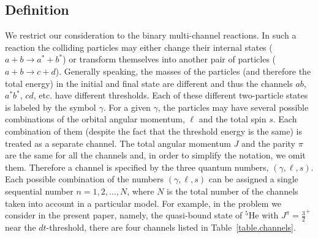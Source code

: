 \documentclass[12pt]{article}
\begin{document}
\subsection{Definition}
We restrict our consideration to the binary multi-channel
reactions. In such a reaction the colliding particles may either change their
internal states ($a+b\to a^*+b^*$) or transform themselves into another pair of
particles ($a+b\to c+d$). Generally speaking, the masses of the particles (and
therefore the total energy) in the initial and final state are different and
thus the channels $ab$, $a^*b^*$, $cd$, etc. have different thresholds. Each of
these different two-particle states is labeled by the symbol $\gamma$. For a
given $\gamma$, the particles may have several possible combinations of the
orbital angular momentum, $\ell$ and
the total spin $s$. Each combination of them (despite the fact that the
threshold energy is the same) is treated as a separate channel. The total
angular momentum $J$ and the parity $\pi$ are the same for all the channels and,
in order to simplify the notation, we omit them. Therefore a channel is
specified by the three quantum
numbers, $(\gamma, \ell, s)$. Each possible combination of the numbers $(\gamma,
\ell, s)$ can be assigned a single sequential number $n=1,2,\dots,N$, where $N$
is the total number of the channels taken into account in a particular model.
For example, in the problem we consider in the present paper, namely, the
quasi-bound state of ${}^5\mathrm{He}$ with $J^\pi=\frac32^+$ near the
$dt$-threshold, there are
four channels listed in Table~\ref{table.channels}.
\end{document}
